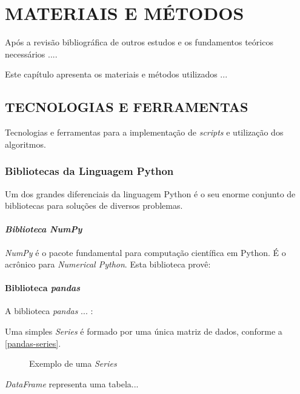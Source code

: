 
\chapter{MATERIAIS E MÉTODOS}\label{ch:materiais-metodos}
Após a revisão bibliográfica de outros estudos e os fundamentos teóricos necessários ....

Este capítulo apresenta os materiais e métodos utilizados ...


\section{TECNOLOGIAS E FERRAMENTAS}\label{sec: tec-ferramenta}
Tecnologias e ferramentas para a implementação de \textit{scripts} e utilização dos algoritmos.

\subsection{Bibliotecas da Linguagem Python}\label{sec:bib_python}
Um dos grandes diferenciais da linguagem Python é o seu enorme conjunto de bibliotecas para soluções de diversos problemas.

 
\subsubsection{\textit{Biblioteca NumPy}}
\textit{NumPy} é o pacote fundamental para computação científica em Python. É o acrônico para \textit{Numerical Python}. Esta biblioteca provê:



\subsubsection{Biblioteca \textit{pandas}}\label{pandas}
A biblioteca \textit{pandas} ... \cite{python-analysis}:

Uma simples \textit{Series} é formado por uma única matriz de dados, conforme a \autoref{pandas-series}.

\begin{figure}[h!]
	\centering
	\caption{Exemplo de uma \textit{Series}}
	\label{pandas-series}
\end{figure}

\textit{DataFrame} representa uma tabela...


